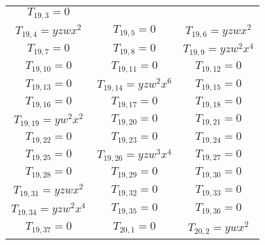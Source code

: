 \begin{longtable}{|c|c|c|}
$T_{19,3}= 0$\\

$T_{19,4}= yzwx^2$&

$T_{19,5}= 0$&

$T_{19,6}= yzwx^2$\\

$T_{19,7}= 0$&

$T_{19,8}= 0$&

$T_{19,9}= yzw^2x^4$\\

$T_{19,10}= 0$&

$T_{19,11}= 0$&

$T_{19,12}= 0$\\

$T_{19,13}= 0$&

$T_{19,14}= yzw^2x^6$&

$T_{19,15}= 0$\\

$T_{19,16}= 0$&

$T_{19,17}= 0$&

$T_{19,18}= 0$\\

$T_{19,19}= yw^2x^2$&

$T_{19,20}= 0$&

$T_{19,21}= 0$\\

$T_{19,22}= 0$&

$T_{19,23}= 0$&

$T_{19,24}= 0$\\

$T_{19,25}= 0$&

$T_{19,26}= yzw^3x^4$&

$T_{19,27}= 0$\\

$T_{19,28}= 0$&

$T_{19,29}= 0$&

$T_{19,30}= 0$\\

$T_{19,31}= yzwx^2$&

$T_{19,32}= 0$&

$T_{19,33}= 0$\\

$T_{19,34}= yzw^2x^4$&

$T_{19,35}= 0$&

$T_{19,36}= 0$\\

$T_{19,37}= 0$&

$T_{20,1}= 0$&

$T_{20,2}= ywx^2$\\


\end{longtable}
